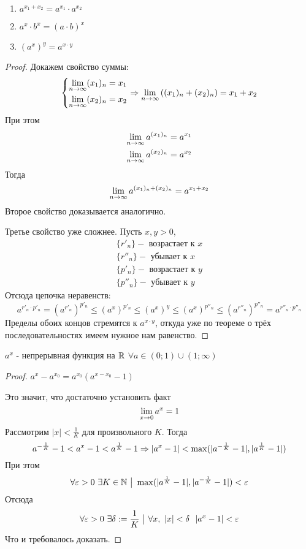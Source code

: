\begin{enumerate}
	\item $a^{x_1 + x_2} = a^{x_1} \cdot a^{x_2}$
	\item $a^x \cdot b^x = (a \cdot b)^x$
	\item $(a^x)^y = a^{x \cdot y}$
\end{enumerate}

\begin{proof}
	Докажем свойство суммы:
	\[
		\left\{\begin{aligned}
		\lim\limits_{n \to \infty} (x_1)_n = x_1
		\\
		\lim\limits_{n \to \infty} (x_2)_n = x_2
		\end{aligned}\right.
		\Rightarrow
		\lim\limits_{n \to \infty} \left((x_1)_n + (x_2)_n\right) = x_1 + x_2
	\]
	При этом
	\begin{align*}
		\lim\limits_{n \to \infty} a^{(x_1)_n} = a^{x_1}
		\\
		\lim\limits_{n \to \infty} a^{(x_2)_n} = a^{x_2}
	\end{align*}
	Тогда
	$$
		\lim\limits_{n \to \infty} a^{(x_1)_n + (x_2)_n} = a^{x_1 + x_2}
	$$
	Второе свойство доказывается аналогично.
	
	Третье свойство уже сложнее. Пусть $x, y > 0$,
	\begin{align*}
		\{r'_n\} - \text{ возрастает к } x
		\\
		\{r''_n\} - \text{ убывает к } x
		\\
		\{p'_n\} - \text{ возрастает к } y
		\\
		\{p''_n\} - \text{ убывает к } y
	\end{align*}
	Отсюда цепочка неравенств:
	\[
		a^{r'_n \cdot p'_n} = (a^{r'_n})^{p'_n} \le (a^x)^{p'_n} \le (a^x)^y \le (a^x)^{p''_n} \le (a^{r''_n})^{p''_n} = a^{r''_n \cdot p''_n}
	\]
	Пределы обоих концов стремятся к $a^{x \cdot y}$, откуда уже по теореме о трёх последовательностях имеем нужное нам равенство.
\end{proof}

\begin{theorem}
	$a^x$ - непрерывная функция на $\mathbb{R}$ $\forall a \in (0; 1) \cup (1; \infty)$
\end{theorem}

\begin{proof}
	$a^x - a^{x_0} = a^{x_0}(a^{x - x_0} - 1)$
	
	Это значит, что достаточно установить факт
	\[
		\lim\limits_{x \to 0} a^x = 1
	\]
	Рассмотрим $|x| < \frac{1}{K}$ для произвольного $K$. Тогда
	\[
		a^{-\frac{1}{K}} - 1 < a^x - 1 < a^{\frac{1}{K}} - 1 \Rightarrow |a^x - 1| < \max(|a^{-\frac{1}{K}} - 1|, |a^{\frac{1}{K}} - 1|)
	\]
	При этом
	\[
		\forall \varepsilon > 0\ \exists K \in \mathbb{N} \ \big|\  \max(|a^{\frac{1}{K}} - 1|, |a^{-\frac{1}{K}} - 1|) < \varepsilon
	\]
	Отсюда
	\[
		\forall \varepsilon > 0\ \exists \delta := \frac{1}{K} \ \big|\  \forall x,\ |x| < \delta\ \ |a^x - 1| < \varepsilon
	\]
	Что и требовалось доказать.
\end{proof}

